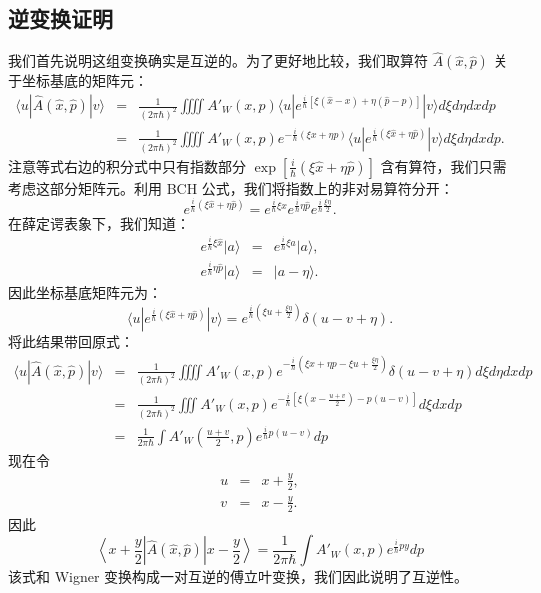 \documentclass[10pt,UTF8]{ctexart}
\begin{document}
\subsection*{逆变换证明}
\noindent
我们首先说明这组变换确实是互逆的。为了更好地比较，我们取算符 $\hat A(\hat x,\hat p)$ 关于坐标基底的矩阵元：
\begin{eqnarray}
	\langle u| \hat A(\hat x,\hat p) |v\rangle
	&=& \frac{1}{(2\pi \hbar)^2} \iiiint A'_W(x,p) \langle u| e^{\frac{i}{\hbar}[\xi(\hat x -x)+\eta(\hat p - p)]} |v\rangle d\xi d\eta dx dp \nonumber \\
	&=& \frac{1}{(2\pi \hbar)^2} \iiiint A'_W(x,p) e^{-\frac{i}{\hbar}(\xi x+\eta p)} \langle u| e^{\frac{i}{\hbar}(\xi \hat x +\eta \hat p)} |v\rangle d\xi d\eta dx dp.
\end{eqnarray}
注意等式右边的积分式中只有指数部分 $\exp[\frac{i}{\hbar}(\xi \hat x +\eta \hat p)]$ 含有算符，我们只需考虑这部分矩阵元。利用 BCH 公式，我们将指数上的非对易算符分开：
\begin{equation}
	e^{\frac{i}{\hbar}(\xi \hat x +\eta \hat p)}
	= e^{\frac{i}{\hbar}\xi \hat x} e^{\frac{i}{\hbar}\eta \hat p} e^{\frac{i}{\hbar}\frac{\xi\eta}{2}}.
\end{equation}
在薛定谔表象下，我们知道：
\begin{eqnarray}
	e^{\frac{i}{\hbar} \xi \hat x} | a \rangle &=& e^{\frac{i}{\hbar} \xi a} |a \rangle, \\
	e^{\frac{i}{\hbar} \eta \hat p} | a \rangle &=& |a-\eta \rangle.
\end{eqnarray}
因此坐标基底矩阵元为：
\begin{equation}
	\langle u| e^{\frac{i}{\hbar}(\xi \hat x +\eta \hat p)} |v\rangle
	= e^{\frac{i}{\hbar} \left( \xi u + \frac{\xi \eta}{2}\right)} \delta(u-v+\eta).
\end{equation}
将此结果带回原式：
\begin{eqnarray}
	\langle u| \hat A(\hat x,\hat p) |v\rangle
	&=& \frac{1}{(2\pi \hbar)^2} \iiiint A'_W(x,p) e^{-\frac{i}{\hbar}\left(\xi x+\eta p - \xi u + \frac{\xi \eta}{2} \right)} \delta(u-v+\eta) d\xi d\eta dx dp \nonumber \\
	&=& \frac{1}{(2\pi \hbar)^2} \iiint A'_W(x,p) e^{-\frac{i}{\hbar}\left[\xi \left(x-\frac{u+v}{2}\right)-p(u-v) \right]} d\xi dx dp \nonumber \\
	&=& \frac{1}{2\pi \hbar} \int A'_W\left(\frac{u+v}{2},p\right) e^{\frac{i}{\hbar}p(u-v)} dp
\end{eqnarray}
现在令
\begin{eqnarray}
	u &=& x+\frac{y}{2}, \\
	v &=& x-\frac{y}{2}.
\end{eqnarray}
因此
\begin{equation}
	\left\langle x+\frac{y}{2} \right| \hat A(\hat x,\hat p) \left| x-\frac{y}{2} \right\rangle = \frac{1}{2\pi \hbar} \int A'_W(x,p) e^{\frac{i}{\hbar}py} dp
\end{equation}
该式和 Wigner 变换构成一对互逆的傅立叶变换，我们因此说明了互逆性。
\end{document}
